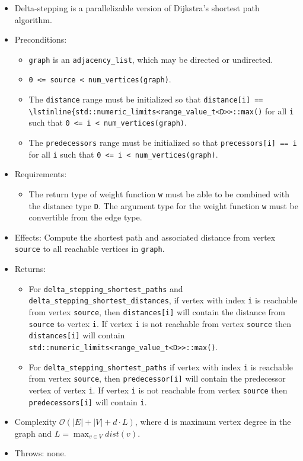 \begin{itemize}
\item[] Delta-stepping is a parallelizable version of Dijkstra's shortest path algorithm.
\item[] Preconditions:
\begin{itemize}
\item[]
\lstinline{graph} is an \lstinline{adjacency_list}, which may be directed or
undirected.
\item[]
\lstinline{0 <= source < num_vertices(graph)}.
\item[]
  The \lstinline{distance} range must be initialized so that 
    \lstinline{distance[i] == \lstinline{std::numeric_limits<range_value_t<D>>::max()} 
      for all \lstinline{i}
      such that \lstinline{0 <= i < num_vertices(graph)}.  
\item[]
  The \lstinline{predecessors} range must be initialized so that
  \lstinline{precessors[i] == i} for all \lstinline{i} such that 
  \lstinline{0 <= i < num_vertices(graph)}.
\end{itemize}
\item[] Requirements: 
\begin{itemize}
\item[]
The return type of weight function \lstinline{w} must be able to
  be combined with the distance type \lstinline{D}.  The argument type for the weight
  function \lstinline{w} must be convertible from the edge type.
\end{itemize}
\item[] 
Effects: Compute the shortest path and associated distance from vertex
\lstinline{source} to all reachable vertices in \lstinline{graph}.
\item[] 
Returns:
\begin{itemize}
\item[] For \lstinline{delta_stepping_shortest_paths} and \lstinline{delta_stepping_shortest_distances},
  if vertex with index \lstinline{i} is reachable from vertex \lstinline{source}, then
  \lstinline{distances[i]} will contain the distance from \lstinline{source} to vertex
  \lstinline{i}.  If vertex \lstinline{i} is not reachable from vertex
  \lstinline{source} then \lstinline{distances[i]} will contain
  \lstinline{std::numeric_limits<range_value_t<D>>::max()}.
\item[]
For \lstinline{delta_stepping_shortest_paths} if vertex with index \lstinline{i} is reachable
from vertex \lstinline{source}, then \lstinline{predecessor[i]} will contain the
predecessor vertex of vertex \lstinline{i}.  If vertex \lstinline{i} is not reachable
from vertex \lstinline{source} then \lstinline{predecessors[i]} will contain
\lstinline{i}.
\end{itemize}
%
\item[] Complexity $\mathcal{O}(|E| + |V| + d\cdot L)$, where d is maximum vertex degree in the graph and $L = \max_{v\in V} dist(v)$.
\item[] Throws: none. 
\end{itemize}





